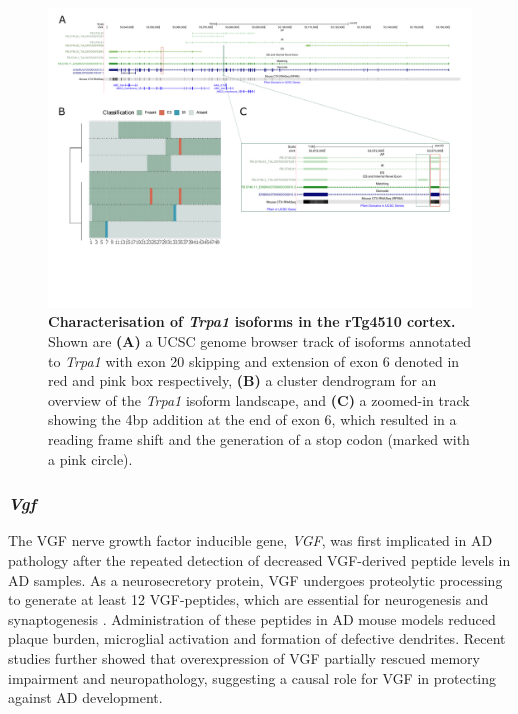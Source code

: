 \begin{landscape}
	\begin{figure}[htp]
		\centering
		\includegraphics[page=13,trim={0 5cm 0 0},scale = 0.85]{Figures/TargetGenes_Annotation_Landscape.pdf}
		\captionsetup{width=1.3\textwidth}
		\caption[Characterisation of the \textit{Trpa1} isoform landscape]%
		{\textbf{Characterisation of \textit{Trpa1} isoforms in the rTg4510 cortex.} Shown are \textbf{(A)} a UCSC genome browser track of isoforms annotated to \textit{Trpa1} with exon 20 skipping and extension of exon 6 denoted in red and pink box respectively, \textbf{(B)} a cluster dendrogram for an overview of the \textit{Trpa1} isoform landscape, and \textbf{(C)} a zoomed-in track showing the 4bp addition at the end of exon 6, which resulted in a reading frame shift and the generation of a stop codon (marked with a pink circle).}   
		\label{fig:trpa1}
	\end{figure}
\end{landscape}
\restoregeometry

\newpage
\subsubsection{\textit{Vgf}}
The VGF nerve growth factor inducible gene, \textit{VGF}, was first implicated in AD pathology after the repeated detection of decreased VGF-derived peptide levels in AD samples\cite{VanSteenoven2019}. As a neurosecretory protein, VGF undergoes proteolytic processing to generate at least 12 VGF-peptides, which are essential for neurogenesis and synaptogenesis \cite{VanSteenoven2019}. Administration of these peptides in AD mouse models reduced plaque burden, microglial activation and formation of defective dendrites\cite{Quinn2021}. Recent studies further showed that overexpression of VGF partially rescued memory impairment and neuropathology, suggesting a causal role for VGF in protecting against AD development\cite{Beckmann2020}. 

